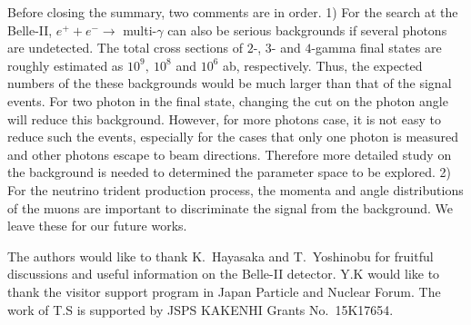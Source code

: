 \documentclass[preprint,amsmath,amssymb,superscriptaddress,nofootinbib]{revtex4}
\begin{document}
Before closing the summary, two comments are in order. 1) For the search at the Belle-II, 
$e^+ + e^- \rightarrow$ multi-$\gamma$ can also be serious backgrounds if several photons are undetected. 
The total cross sections of $2$-, $3$- and $4$-gamma final states are roughly estimated as $10^9,~10^8$ and $10^6$ 
ab, respectively. Thus, the expected numbers of the these backgrounds would be much larger than that of the signal 
events.  
For two photon in the final state, 
changing the cut on the photon angle will reduce this background. However, for more photons case, it is not easy to 
reduce such the events, especially for the cases that only one photon is measured and other photons escape to beam directions. Therefore more detailed study on the background is needed to determined the 
parameter space to be explored. 
2) For the neutrino trident production process, the momenta and angle distributions 
of the muons are important to discriminate the signal from the background. We leave these for our future works. 


\begin{acknowledgements}
The authors would like to thank K.~Hayasaka and T.~Yoshinobu for fruitful discussions and useful information on the 
Belle-II detector. Y.K would like to thank the visitor support program in Japan Particle and Nuclear Forum.
The work of T.S is supported by JSPS KAKENHI Grants No.~15K17654. 
\end{acknowledgements}



\end{document}
